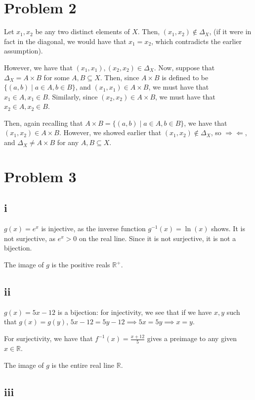 \documentclass[12pt,letterpaper]{article}
\theoremstyle{definition}
\newcommand{\contra}{\Rightarrow\!\Leftarrow}
\newcommand{\R}{\mathbb{R}}
\begin{document}
\section*{Problem 2}

Let $x_1, x_2$ be any two distinct elements of $X$. Then, $(x_1, x_2) \notin
\Delta_X$, (if it were in fact in the diagonal, we would have that $x_1 = x_2$, which contradicts the
earlier assumption).

However, we have that $(x_1, x_1), (x_2, x_2) \in \Delta_X$. Now, suppose that
$\Delta_X = A \times B$ for some $A,B \subseteq X$. Then, since $A \times B$ is
defined to be $\{(a,b) \mid a \in A, b \in B\}$, and $(x_1, x_1) \in A \times
B$, we must have that $x_1 \in A, x_1 \in B$. Similarly, since $(x_2, x_2) \in A \times
B$, we must have that $x_2 \in A, x_2 \in B$. 

Then, again recalling that $A \times B = \{(a,b) \mid a \in A, b \in B\}$, we
have that $(x_1, x_2) \in A \times B$. However, we showed earlier that $(x_1,
x_2) \notin \Delta_X$, so $\contra$, and $\Delta_X \neq A \times B$ for any $A,B
\subseteq X$.

\section*{Problem 3}

\subsection*{i}

$g(x) = e^x$ is injective, as the inverse function $g^{-1}(x) = \ln(x)$ shows.
It is not surjective, as $e^x > 0$ on the real line. Since it is not surjective,
it is not a bijection.

The image of $g$ is the positive reals $\R^+$.

\subsection*{ii}

$g(x) = 5x-12$ is a bijection: for injectivity, we see that if we have $x,y$
such that $g(x) = g(y)$, $5x - 12 = 5y - 12 \implies 5x = 5y \implies x = y$.

For surjectivity, we have that $f^{-1}(x) = \frac{x + 12}{5}$ gives a preimage
to any given $x \in \R$.

The image of $g$ is the entire real line $\R$.

\subsection*{iii}
\end{document}

